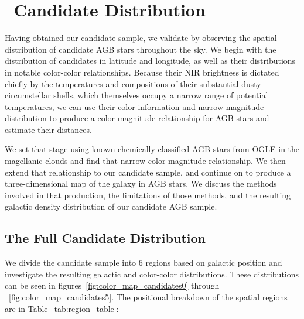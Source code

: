 \section{\agb\, Candidate Distribution}
\label{sec:distribution}
Having obtained our candidate sample, we validate by observing the spatial distribution of candidate AGB stars throughout the sky. We begin with the distribution of candidates in latitude and longitude, as well as their distributions in notable color-color relationships. Because their NIR brightness is dictated chiefly by the temperatures and compositions of their substantial dusty circumstellar shells, which themselves occupy a narrow range of potential temperatures, we can use their color information and narrow magnitude distribution to produce a color-magnitude relationship for AGB stars and estimate their distances. 

We set that stage using known chemically-classified AGB stars from OGLE in the magellanic clouds and find that narrow color-magnitude relationship. We then extend that relationship to our candidate sample, and continue on to produce a three-dimensional map of the galaxy in AGB stars. We discuss the methods involved in that production, the limitations of those methods, and the resulting galactic density distribution of our candidate AGB sample.

\subsection{The Full Candidate Distribution}
We divide the candidate sample into 6 regions based on galactic position and investigate the resulting galactic and color-color distributions. These distributions can be seen in figures~\ref{fig:color_map_candidates0} through ~\ref{fig:color_map_candidates5}. The positional breakdown of the spatial regions are in Table~\ref{tab:region_table}:

